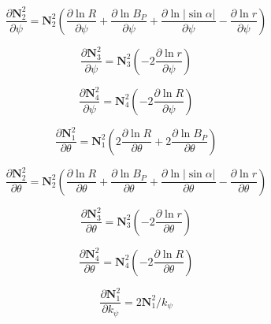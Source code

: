 \documentclass[a4paper,12pt]{article}%
\begin{document}
\begin{equation}
\frac{\partial\mathbf{N}_{2}^{2}}{\partial\psi}=\mathbf{N}_{2}^{2}\left(
\frac{\partial\ln R}{\mathcal{\partial}\psi}+\frac{\partial\ln B_{P}%
}{\mathcal{\partial}\psi}+\frac{\partial\ln\left\vert \sin\alpha\right\vert
}{\mathcal{\partial}\psi}-\frac{\partial\ln r}{\mathcal{\partial}\psi}\right)
\end{equation}
%

\begin{equation}
\frac{\partial\mathbf{N}_{3}^{2}}{\partial\psi}=\mathbf{N}_{3}^{2}\left(
-2\frac{\partial\ln r}{\mathcal{\partial}\psi}\right)
\end{equation}
%

\begin{equation}
\frac{\partial\mathbf{N}_{4}^{2}}{\partial\psi}=\mathbf{N}_{4}^{2}\left(
-2\frac{\partial\ln R}{\mathcal{\partial}\psi}\right)
\end{equation}
%

\begin{equation}
\frac{\partial\mathbf{N}_{1}^{2}}{\partial\theta}=\mathbf{N}_{1}^{2}\left(
2\frac{\partial\ln R}{\mathcal{\partial}\theta}+2\frac{\partial\ln B_{P}%
}{\mathcal{\partial}\theta}\right)
\end{equation}
%

\begin{equation}
\frac{\partial\mathbf{N}_{2}^{2}}{\partial\theta}=\mathbf{N}_{2}^{2}\left(
\frac{\partial\ln R}{\mathcal{\partial}\theta}+\frac{\partial\ln B_{P}%
}{\mathcal{\partial}\theta}+\frac{\partial\ln\left\vert \sin\alpha\right\vert
}{\mathcal{\partial}\theta}-\frac{\partial\ln r}{\mathcal{\partial}\theta
}\right)
\end{equation}
%

\begin{equation}
\frac{\partial\mathbf{N}_{3}^{2}}{\partial\theta}=\mathbf{N}_{3}^{2}\left(
-2\frac{\partial\ln r}{\mathcal{\partial}\theta}\right)
\end{equation}
%

\begin{equation}
\frac{\partial\mathbf{N}_{4}^{2}}{\partial\theta}=\mathbf{N}_{4}^{2}\left(
-2\frac{\partial\ln R}{\mathcal{\partial}\theta}\right)
\end{equation}
%

\begin{equation}
\frac{\partial\mathbf{N}_{1}^{2}}{\partial k_{\psi}}=2\mathbf{N}_{1}%
^{2}/k_{\psi}%
\end{equation}
%
\end{document}
